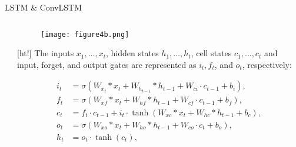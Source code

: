 \documentclass[10pt,aspectratio=169,dvipsnames]{beamer} %
\begin{document}
\begin{frame}{LSTM \& ConvLSTM}
\begin{columns}[T]
\begin{column}[t]{0.5\textwidth}
\begin{tcolorbox}
\begin{equation}
						\label{eq:eq4}
					\end{equation} 
				\end{tcolorbox}
			\end{column}
			\begin{column}[t]{0.48\textwidth}
				\begin{figure}
					\centering
					\texttt{[image: figure4b.png]}
				\end{figure}[ht!]
				The inputs \(x_1, \dots, x_t\), hidden states \(h_1, \dots, h_t\), cell states \(c_1, \dots, c_t\) and input, forget, and output gates are represented as \(i_t, f_t\), and \(o_t\), respectively:
				\begin{tcolorbox}
					\begin{equation}
						\begin{aligned}
							i_{t} &=\sigma\left(W_{x_t} * x_{t}+W_{h_{t-1}} * h_{t-1}+W_{c i} \cdot c_{t-1}+b_{i}\right),
							\\
							f_{t} &=\sigma\left(W_{x f} * x_{t}+W_{h f} * h_{t-1}+W_{c f} \cdot c_{t-1}+b_{f}\right), \\
							c_{t} &=f_{t} \cdot c_{t-1}+i_{t} \cdot \tanh \left(W_{x c} * x_{t}+W_{h c} * h_{t-1}+b_{c}\right), 
							\\
							o_{t} &=\sigma\left(W_{x o} * x_{t}+W_{h o} * h_{t-1}+W_{c o} \cdot c_{t}+b_{o}\right), \\
							h_{t} &=o_{t} \cdot \tanh \left(c_{t}\right),
						\end{aligned}
						\label{eq:eq5}
					\end{equation}
				\end{tcolorbox}				
			\end{column}
		\end{columns}
	\end{frame}
\end{document}
